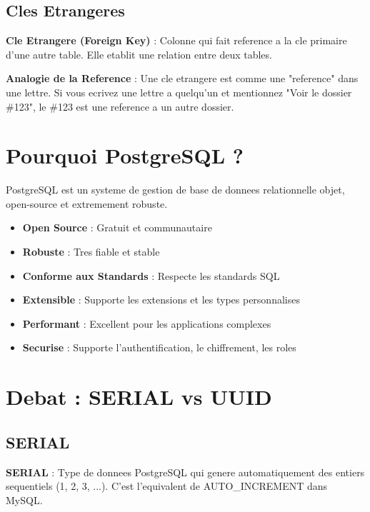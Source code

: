 \documentclass[a4paper,12pt]{book}
\begin{document}
\subsection{Cles Etrangeres}

\begin{definitionbox}
    \textbf{Cle Etrangere (Foreign Key)} : Colonne qui fait reference a la cle primaire d'une autre table. Elle etablit une relation entre deux tables.
\end{definitionbox}

\begin{analogybox}
    \textbf{Analogie de la Reference} : Une cle etrangere est comme une "reference" dans une lettre. Si vous ecrivez une lettre a quelqu'un et mentionnez "Voir le dossier \#123", le \#123 est une reference a un autre dossier.
\end{analogybox}

\section{Pourquoi PostgreSQL ?}

PostgreSQL est un systeme de gestion de base de donnees relationnelle objet, open-source et extremement robuste.

\begin{itemize}
    \item \textbf{Open Source} : Gratuit et communautaire
    \item \textbf{Robuste} : Tres fiable et stable
    \item \textbf{Conforme aux Standards} : Respecte les standards SQL
    \item \textbf{Extensible} : Supporte les extensions et les types personnalises
    \item \textbf{Performant} : Excellent pour les applications complexes
    \item \textbf{Securise} : Supporte l'authentification, le chiffrement, les roles
\end{itemize}

\section{Debat : SERIAL vs UUID}

\subsection{SERIAL}

\begin{definitionbox}
    \textbf{SERIAL} : Type de donnees PostgreSQL qui genere automatiquement des entiers sequentiels (1, 2, 3, ...). C'est l'equivalent de AUTO\_INCREMENT dans MySQL.
\end{definitionbox}
\end{document}

